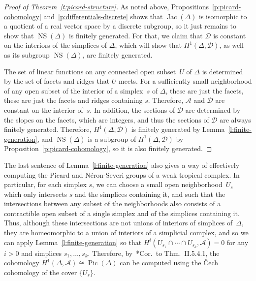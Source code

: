 \documentclass[11pt,reqno]{amsart}
\theoremstyle{definition}
\newcommand{\cA}{\mathcal A}
\newcommand{\cD}{\mathcal D}
\newcommand{\isom}{\cong}
\newcommand{\Jac}{\operatorname{Jac}}
\newcommand{\NS}{\operatorname{NS}}
\newcommand{\Pic}{\operatorname{Pic}}
\begin{document}
\begin{proof}[Proof of Theorem~\ref{t:picard-structure}]
As noted above, Propositions~\ref{p:picard-cohomology}
and~\ref{p:differentials-discrete} shows that $\Jac(\Delta)$ is isomorphic to a
quotient of a real vector space by a discrete subgroup, so it just remains to
show that $\NS(\Delta)$ is finitely generated. For that, we claim that $\cD$ is
constant on the interiors of the simplices of $\Delta$, which will show that
$H^1(\Delta, \cD)$, as well as its subgroup $\NS(\Delta)$, are finitely
generated.

The set of linear functions on any connected open subset~$U$ of $\Delta$ is
determined by the set of facets and ridges that $U$ meets. For a sufficiently
small neighborhood of any open subset of the interior of a simplex~$s$ of
$\Delta$, these are just the facets, these are just the facets and ridges
containing $s$. Therefore, $\cA$ and $\cD$ are constant on the interior of~$s$.
In addition, the sections of $\cD$ are determined by the slopes on the facets,
which are integers, and thus the sections of $\cD$ are always finitely
generated. Therefore, $H^1(\Delta, \cD)$ is finitely generated by
Lemma~\ref{l:finite-generation}, and $\NS(\Delta)$ is a subgroup of $H^1(\Delta,
\cD)$ by Proposition~\ref{p:picard-cohomology}, so it is also finitely
generated.
\end{proof}

\begin{rmk}\label{r:computation}
The last sentence of Lemma~\ref{l:finite-generation} also gives a way of
effectively computing the Picard and N\'eron-Severi groups of a weak tropical
complex. In particular, for each simplex $s$, we can choose a small open
neighborhood~$U_s$ which only intersects $s$ and the simplices containing it,
and such that the intersections between any subset of the neighborhoods also
consists of a contractible open subset of a single simplex and of the simplices
containing it. Thus, although these intersections are not unions of interiors of
simplices of~$\Delta$, they are homeomorphic to a union of interiors of a
simplicial complex, and so we can apply Lemma~\ref{l:finite-generation} so that
$H^i(U_{s_1} \cap \cdots \cap U_{s_k}, \cA) = 0$ for any $i > 0$ and simplices
$s_1, \ldots, s_k$. Therefore, by~\cite{godement}*{Cor.\ to Thm.~II.5.4.1}, the
cohomology $H^1(\Delta, \cA) \isom \Pic(\Delta)$ can be computed using the \v
Cech cohomology of the cover $\{U_s\}$.
\end{rmk}
\end{document}
